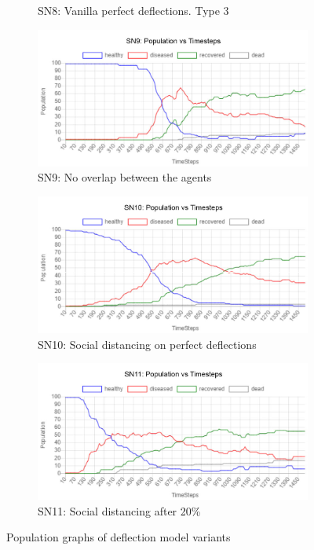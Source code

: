 \documentclass[a4paper,11pt]{article}
\begin{document}
\begin{figure}[H]
\begin{subfigure}[b]{0.49\linewidth}
            \caption{SN8:  Vanilla perfect deflections. Type 3}
            \label{fig:SN8T3}
        \end{subfigure}
        \begin{subfigure}[b]{0.49\linewidth}
            \includegraphics[width=\linewidth]{pop_graphs/SN9_pop.jpg}
            \caption{SN9:  No overlap between the agents}
            \label{fig:SN9}
        \end{subfigure}
        \begin{subfigure}[b]{0.49\linewidth}
            \includegraphics[width=\linewidth]{pop_graphs/SN10_pop.jpg}
            \caption{SN10:  Social distancing on perfect deflections}
            \label{fig:SN10}
        \end{subfigure}
        \begin{subfigure}[b]{0.49\linewidth}
            \includegraphics[width=\linewidth]{pop_graphs/SN11_pop.jpg}
            \caption{SN11:  Social distancing after 20\%}
            \label{fig:SN11}
        \end{subfigure}
        \caption{Population graphs of deflection model variants}
    \end{figure}
\end{document}
